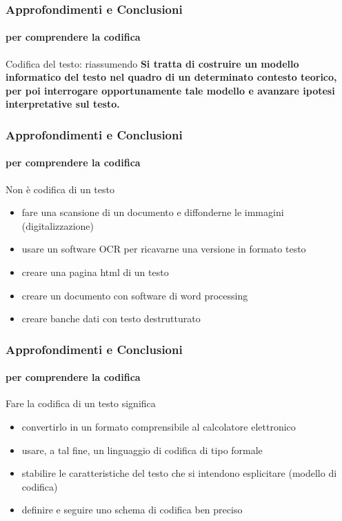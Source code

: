 \begin{frame}
	\frametitle{Approfondimenti e Conclusioni}
	\framesubtitle{per comprendere la codifica}
	\addtocounter{nframe}{1}

	\begin{block}{Codifica del testo: riassumendo}
		\textbf{Si tratta di costruire un modello informatico del testo nel quadro di un determinato contesto teorico, per poi interrogare opportunamente tale modello e avanzare ipotesi interpretative sul testo.}
	\end{block}

\end{frame}

\begin{frame}
	\frametitle{Approfondimenti e Conclusioni}
	\framesubtitle{per comprendere la codifica}
	\addtocounter{nframe}{1}

	\begin{block}{Non è codifica di un testo}
		\begin{itemize}
			\item fare una scansione di un documento e diffonderne le immagini (digitalizzazione)
			\item usare un software OCR per ricavarne una versione in formato testo
			\item creare una pagina html di un testo
			\item creare un documento con software di word processing
			\item creare banche dati con testo destrutturato
		\end{itemize}
	\end{block}

\end{frame}

\begin{frame}
	\frametitle{Approfondimenti e Conclusioni}
	\framesubtitle{per comprendere la codifica}
	\addtocounter{nframe}{1}

	\begin{block}{Fare la codifica di un testo significa}
		\begin{itemize}
			\item convertirlo in un formato comprensibile al calcolatore elettronico
			\item usare, a tal fine, un linguaggio di codifica di tipo formale
			\item stabilire le caratteristiche del testo che si intendono esplicitare (modello di codifica)
			\item definire e seguire uno schema di codifica ben preciso
			
		\end{itemize}

	\end{block}

\end{frame}



